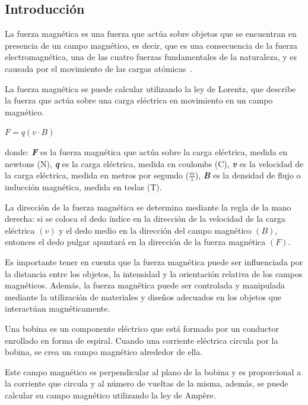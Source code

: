 \documentclass[letterpaper, 12pt]{article}
\begin{document}
\begin{multicols}{2}

	\section{Introducción}

	La fuerza magnética es una fuerza que actúa sobre objetos que se encuentran
	en presencia de un campo magnético, es decir, que es una consecuencia de la
	fuerza electromagnética, una de las cuatro fuerzas fundamentales de la
	naturaleza, y es causada por el movimiento de las cargas atómicas~\cite{FuerzaMagnetica}.

	La fuerza magnética se puede calcular utilizando la ley de Lorentz,
	que describe la fuerza que actúa sobre una carga eléctrica en movimiento
	en un campo magnético.

	{\large $F = q (v \cdot B)$}

	donde: \hfill \break{}
	\textbf{\textit{F}} es la fuerza magnética que actúa sobre la carga eléctrica,
	medida en newtons (N),
	\textbf{\textit{q}} es la carga eléctrica, medida en coulombs (C),
	\textbf{\textit{v}} es la velocidad de la carga eléctrica, medida en metros por segundo
	($\frac{m}{s}$),
	\textbf{\textit{B}} es la densidad de flujo o inducción magnética, medida en teslas (T).

	La dirección de la fuerza magnética se determina mediante la regla de la
	mano derecha: si se coloca el dedo índice en la dirección de la velocidad
	de la carga eléctrica $(v)$ y el dedo medio en la dirección del campo
	magnético $(B)$, entonces el dedo pulgar apuntará en la dirección de la
	fuerza magnética $(F)$.

	Es importante tener en cuenta que la fuerza magnética puede ser
	influenciada por la distancia entre los objetos, la intensidad y
	la orientación relativa de los campos magnéticos. Además, la fuerza
	magnética puede ser controlada y manipulada mediante la utilización de
	materiales y diseños adecuados en los objetos que interactúan magnéticamente.

	Una bobina es un componente eléctrico que está formado por un conductor
	enrollado en forma de espiral. Cuando una corriente eléctrica circula por
	la bobina, se crea un campo magnético alrededor de ella.

	Este campo magnético es perpendicular al plano de la bobina y es
	proporcional a la corriente que circula y al número de vueltas de la misma,
	además, se puede calcular su campo magnético utilizando la ley de Ampère.


\end{multicols}
\end{document}
